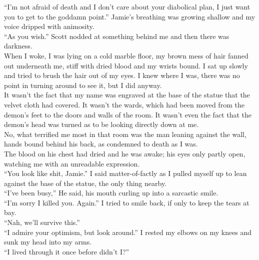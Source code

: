 \documentclass[a5paper]{scrartcl}
\begin{document}
\enquote{I'm not afraid of death and I don't care about your diabolical plan, I just want you to get to the goddamn point.} Jamie's breathing was growing shallow and my voice dripped with animosity.\\


\enquote{As you wish.} Scott nodded at something behind me and then there was darkness.\\


When I woke, I was lying on a cold marble floor, my brown mess of hair fanned out underneath me, stiff with dried blood and my wrists bound. I sat up slowly and tried to brush the hair out of my eyes. I knew where I was, there was no point in turning around to see it, but I did anyway.\\


It wasn't the fact that my name was engraved at the base of the statue that the velvet cloth had covered. It wasn't the wards, which had been moved from the demon's feet to the doors and walls of the room. It wasn't even the fact that the demon's head was turned as to be looking directly down at me.\\


No, what terrified me most in that room was the man leaning against the wall, hands bound behind his back, as condemned to death as I was.\\


The blood on his chest had dried and he was awake; his eyes only partly open, watching me with an unreadable expression.\\


\enquote{You look like shit, Jamie.} I said matter-of-factly as I pulled myself up to lean against the base of the statue, the only thing nearby.\\


\enquote{I've been busy,} He said, his mouth curling up into a sarcastic smile.\\


\enquote{I'm sorry I killed you. Again.} I tried to smile back, if only to keep the tears at bay.\\


\enquote{Nah, we'll survive this.}\\


\enquote{I admire your optimism, but look around.} I rested my elbows on my knees and sunk my head into my arms.\\


\enquote{I lived through it once before didn't I?}\\
\end{document}

